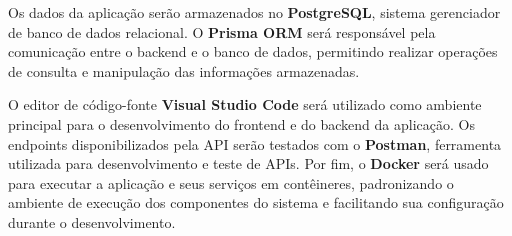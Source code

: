 Os dados da aplicação serão armazenados no \textbf{PostgreSQL}, sistema gerenciador de banco de dados relacional. O \textbf{Prisma ORM} será responsável pela comunicação entre o backend e o banco de dados, permitindo realizar operações de consulta e manipulação das informações armazenadas.

O editor de código-fonte \textbf{Visual Studio Code} será utilizado como ambiente principal para o desenvolvimento do frontend e do backend da aplicação. Os endpoints disponibilizados pela API serão testados com o 
\textbf{Postman}, ferramenta utilizada para desenvolvimento e teste de APIs. Por fim, o \textbf{Docker} será usado para executar a aplicação e seus serviços em contêineres, padronizando o ambiente de execução dos componentes do sistema e facilitando sua configuração durante o desenvolvimento.